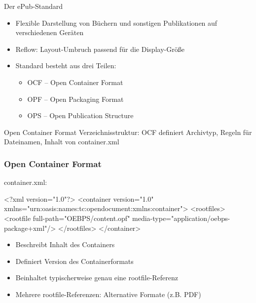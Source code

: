 \documentclass[hyperref={pdfpagelabels=false}]{beamer}
\begin{document}
\begin{frame}{Der ePub-Standard}
	\begin{itemize}
		\item Flexible Darstellung von Büchern und sonstigen Publikationen auf verschiedenen Geräten
		\item Reflow: Layout-Umbruch passend für die Display-Größe
		\item Standard besteht aus drei Teilen:
		\begin{itemize}
			\item OCF -- Open Container Format
			\item OPF -- Open Packaging Format
			\item OPS -- Open Publication Structure
		\end{itemize}
	\end{itemize}
\end{frame}

\begin{frame}{Open Container Format}
Verzeichnisstruktur:
OCF definiert Archivtyp, Regeln für Dateinamen, Inhalt von container.xml
\end{frame}


\begin{frame}[fragile]
\frametitle{Open Container Format}
container.xml:
\begin{xml}
<?xml version="1.0"?>
<container version="1.0" xmlns="urn:oasis:names:tc:opendocument:xmlns:container">
    <rootfiles>
        <rootfile full-path="OEBPS/content.opf" media-type="application/oebps-package+xml"/>
   </rootfiles>
</container>
\end{xml}
	\begin{itemize}
		\item Beschreibt Inhalt des Containers
		\item Definiert Version des Containerformats
		\item Beinhaltet typischerweise genau eine rootfile-Referenz
		\item Mehrere rootfile-Referenzen: Alternative Formate (z.B. PDF)
	\end{itemize}
\end{frame}
\end{document}
